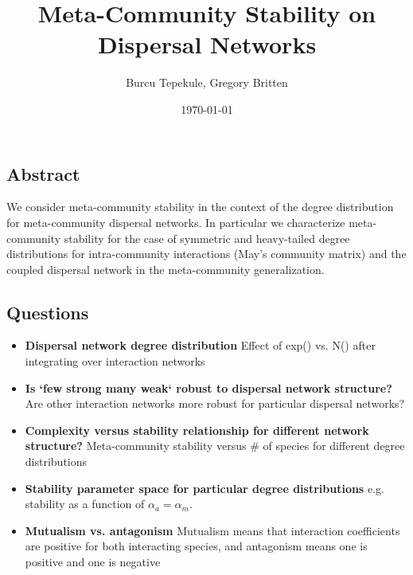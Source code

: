 \documentclass[12pt]{article}
\title{Meta-Community Stability on Dispersal Networks}
\author{\small{Burcu Tepekule, Gregory Britten}}
\date{\small{\printdayoff\today}}
\begin{document}
\maketitle 

\subsection*{Abstract}
We consider meta-community stability in the context of the degree distribution for meta-community dispersal networks. In particular we characterize meta-community stability for the case of symmetric and heavy-tailed degree distributions for intra-community interactions (May's community matrix) and the coupled dispersal network in the meta-community generalization. 

\subsection*{Questions}

\begin{itemize}

\item \textbf{Dispersal network degree distribution} Effect of exp() vs. N() after integrating over interaction networks
\item \textbf{Is `few strong many weak` robust to dispersal network structure?} Are other interaction networks more robust for particular dispersal networks? 
\item \textbf{Complexity versus stability relationship for different network structure?} Meta-community stability versus \# of species for different degree distributions
\item \textbf{Stability parameter space for particular degree distributions} e.g. stability  as a function of $\alpha_a = \alpha_m$.
\item \textbf{Mutualism vs. antagonism} Mutualism means that interaction coefficients are positive for both interacting species, and antagonism means one is positive and one is negative
\end{itemize}
\end{document}
